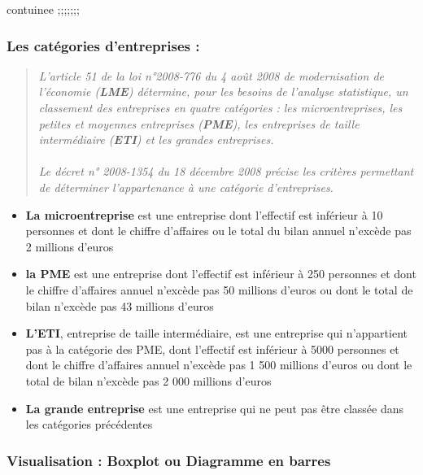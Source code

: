 \documentclass[mstat,12pt]{unswthesis}
\begin{document}
contuinee ;;;;;;;

\subsubsection{Les catégories d'entreprises
:}\label{les-catuxe9gories-dentreprises}

\bigskip
\scriptsize
\begin{quote}
\textit{L’article 51 de la loi n°2008-776 du 4 août 2008 de modernisation de l’économie (\textbf{LME}) détermine, pour les besoins de l’analyse statistique, un classement des entreprises en quatre catégories : les microentreprises, les petites et moyennes entreprises (\textbf{PME}), les entreprises de taille intermédiaire (\textbf{ETI}) et les grandes entreprises.\\ \\Le décret n° 2008-1354 du 18 décembre 2008 précise les critères permettant de déterminer l’appartenance à une catégorie d'entreprises.}
\end{quote}
\normalsize

\begin{itemize}[label=$\circ$]
  \item \textnormal{ \textbf{La microentreprise} est une entreprise dont l'effectif est inférieur à 10 personnes et dont le chiffre d'affaires ou le total du bilan annuel n'excède pas 2 millions d'euros}
\item \textnormal{ \textbf{la PME} est une entreprise dont l’effectif est inférieur à 250 personnes
et dont le chiffre d’affaires annuel n'excède pas 50 millions d'euros ou
dont le total de bilan n'excède pas 43 millions d'euros }
\item \textnormal{\textbf{L'ETI}, entreprise de taille intermédiaire, est une entreprise qui n'appartient pas à la catégorie des PME, dont l’effectif est inférieur à 5000 personnes et dont le chiffre d'affaires annuel n'excède pas 1 500 millions d'euros ou dont le total de bilan n'excède pas 2 000 millions d'euros}
\item \textnormal{\textbf{La grande entreprise} est une entreprise qui ne peut pas être classée
dans les catégories précédentes}
\end{itemize}
\newpage

\subsubsection{Visualisation : Boxplot ou Diagramme en
barres}\label{visualisation-boxplot-ou-diagramme-en-barres}
\end{document}
